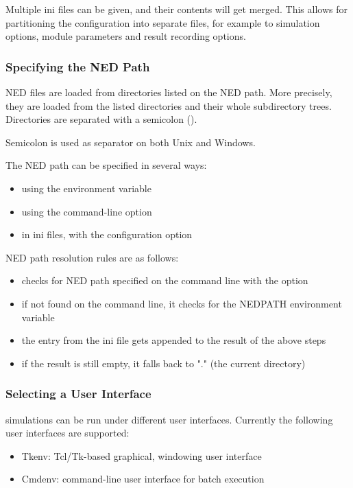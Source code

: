 Multiple ini files can be given, and their contents will get merged. This
allows for partitioning the configuration into separate files, for example
to simulation options, module parameters and result recording options.


\subsubsection{Specifying the NED Path}

NED files are loaded from directories listed on the NED path. More precisely,
they are loaded from the listed directories and their whole subdirectory trees.
Directories are separated with a semicolon (\ttt{;}).

\begin{note}
Semicolon is used as separator on both Unix and Windows.
\end{note}

The NED path can be specified in several ways:
\begin{itemize}
  \item using the  environment variable
  \item using the  command-line option
  \item in ini files, with the  configuration option
\end{itemize}

NED path resolution rules are as follows:
\begin{itemize}
  \item {\opp} checks for NED path specified on the command line with the  option
  \item if not found on the command line, it checks for the NEDPATH environment variable
  \item the  entry from the ini file gets appended to the result of the above steps
  \item if the result is still empty, it falls back to "." (the current directory)
\end{itemize}


\subsubsection{Selecting a User Interface}

{\opp} simulations can be run under different user interfaces.
Currently the following user interfaces are supported:

\begin{itemize}
  \item Tkenv: Tcl/Tk-based graphical, windowing user interface
  \item Cmdenv: command-line user interface for batch execution
\end{itemize}

